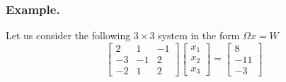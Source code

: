 \documentclass[../../../main.tex]{subfiles}
\begin{document}
\subsubsection{Example.}
Let us consider the following $3 \times 3$ system in the form $\Omega x=W$
\begin{equation*}
    \begin{bmatrix}
        2  & 1  & -1 \\
        -3 & -1 & 2  \\
        -2 & 1  & 2
    \end{bmatrix}
    \begin{bmatrix}
        x_1 \\ x_2 \\ x_3
    \end{bmatrix}
    =
    \begin{bmatrix}
        8 \\ -11 \\ -3
    \end{bmatrix}
\end{equation*}
\end{document}
